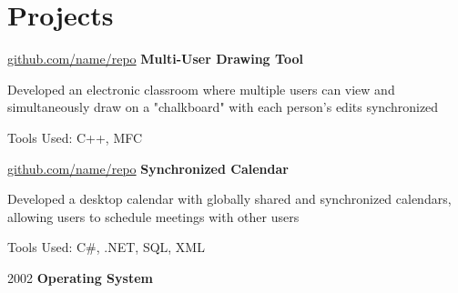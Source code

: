 \documentclass[10pt, letterpaper]{article}
\begin{document}
    \section{Projects}



        
        \begin{twocolentry}{
            \href{https://github.com/sinaatalay/rendercv}{github.com/name/repo}
        }
            \textbf{Multi-User Drawing Tool}\end{twocolentry}

        \vspace{0.10 cm}
        \begin{onecolentry}
            \begin{highlights}
                \item Developed an electronic classroom where multiple users can view and simultaneously draw on a "chalkboard" with each person's edits synchronized
                \item Tools Used: C++, MFC
            \end{highlights}
        \end{onecolentry}


        \vspace{0.2 cm}

        \begin{twocolentry}{
            \href{https://github.com/sinaatalay/rendercv}{github.com/name/repo}
        }
            \textbf{Synchronized Calendar}\end{twocolentry}

        \vspace{0.10 cm}
        \begin{onecolentry}
            \begin{highlights}
                \item Developed a desktop calendar with globally shared and synchronized calendars, allowing users to schedule meetings with other users
                \item Tools Used: C\#, .NET, SQL, XML
            \end{highlights}
        \end{onecolentry}


        \vspace{0.2 cm}

        \begin{twocolentry}{
            2002
        }
            \textbf{Operating System}\end{twocolentry}
\end{document}
